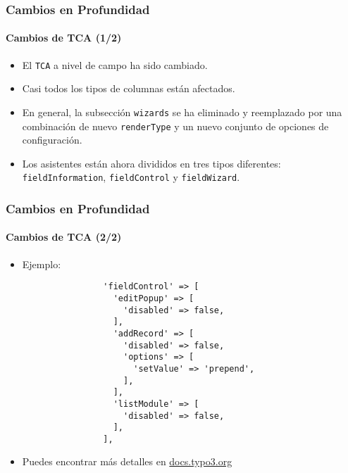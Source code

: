 \begin{frame}[fragile]
	\frametitle{Cambios en Profundidad}
	\framesubtitle{Cambios de TCA (1/2)}

	\begin{itemize}

		\item El \texttt{TCA} a nivel de campo ha sido cambiado.

		\item Casi todos los tipos de columnas están afectados.

		\item En general, la subsección \texttt{wizards} se ha eliminado y reemplazado por una combinación de nuevo
			\texttt{renderType} y un nuevo conjunto de opciones de configuración.

		\item Los asistentes están ahora divididos en tres tipos diferentes: \texttt{fieldInformation}, \texttt{fieldControl}
			y \texttt{fieldWizard}.

	\end{itemize}

\end{frame}

\begin{frame}[fragile]
	\frametitle{Cambios en Profundidad}
	\framesubtitle{Cambios de TCA (2/2)}

	\lstset{basicstyle=\tiny\ttfamily}

	\begin{itemize}
		\item Ejemplo:

			\begin{lstlisting}
				'fieldControl' => [
				  'editPopup' => [
				    'disabled' => false,
				  ],
				  'addRecord' => [
				    'disabled' => false,
				    'options' => [
				      'setValue' => 'prepend',
				    ],
				  ],
				  'listModule' => [
				    'disabled' => false,
				  ],
				],
			\end{lstlisting}

		\item Puedes encontrar más detalles en
			\href{https://docs.typo3.org/typo3cms/extensions/core/8-dev/singlehtml/Index.html#deprecation-79440-formengine-element-expansion}{docs.typo3.org}

	\end{itemize}

\end{frame}


